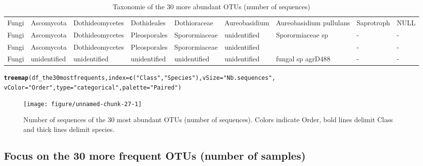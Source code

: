 \documentclass[12pt]{article}\usepackage[]{graphicx}\usepackage[]{color}
\makeatletter
\newcommand{\hlstr}[1]{\textcolor[rgb]{0.192,0.494,0.8}{#1}}%
\newcommand{\hlstd}[1]{\textcolor[rgb]{0.345,0.345,0.345}{#1}}%
\newcommand{\hlkwc}[1]{\textcolor[rgb]{0.333,0.667,0.333}{#1}}%
\newcommand{\hlkwd}[1]{\textcolor[rgb]{0.737,0.353,0.396}{\textbf{#1}}}%
\newenvironment{kframe}{%
 \def\at@end@of@kframe{}%
 \ifinner\ifhmode%
  \def\at@end@of@kframe{\end{minipage}}%
  \begin{minipage}{\columnwidth}%
 \fi\fi%
 \def\FrameCommand##1{\hskip\@totalleftmargin \hskip-\fboxsep
 \colorbox{shadecolor}{##1}\hskip-\fboxsep
     \hskip-\linewidth \hskip-\@totalleftmargin \hskip\columnwidth}%
 \MakeFramed {\advance\hsize-\width
   \@totalleftmargin\z@ \linewidth\hsize
   \@setminipage}}%
 {\par\unskip\endMakeFramed%
 \at@end@of@kframe}
\newenvironment{knitrout}{}{} %
\numberwithin{figure}{section}
\makeatother
\begin{document}
\begin{landscape}
\begin{table}[ht]
\begin{tabular}{lllllllll}
  Fungi & Ascomycota & Dothideomycetes & Dothideales & Dothioraceae & Aureobasidium & Aureobasidium pullulans & Saprotroph & NULL \\ 
  Fungi & Ascomycota & Dothideomycetes & Pleosporales & Sporormiaceae & unidentified & Sporormiaceae sp & - & - \\ 
  Fungi & Ascomycota & Dothideomycetes & Pleosporales & Sporormiaceae & unidentified &  & - & - \\ 
  Fungi & unidentified & unidentified & unidentified & unidentified & unidentified & fungal sp agrD488 & - & - \\ 
   \hline
\end{tabular}
\endgroup
\caption{Taxonomie of the 30 more
             abundant OTUs (number of sequences)} 
\end{table}

\end{landscape}

\begin{knitrout}\small
{}\color{fgcolor}\begin{kframe}
\begin{alltt}
\hlkwd{treemap}\hlstd{(df_the30mostfrequents,} \hlkwc{index} \hlstd{=} \hlkwd{c}\hlstd{(}\hlstr{"Class"}\hlstd{,} \hlstr{"Species"}\hlstd{),} \hlkwc{vSize} \hlstd{=} \hlstr{"Nb.sequences"}\hlstd{,}
        \hlkwc{vColor} \hlstd{=} \hlstr{"Order"}\hlstd{,} \hlkwc{type} \hlstd{=} \hlstr{"categorical"}\hlstd{,} \hlkwc{palette} \hlstd{=} \hlstr{"Paired"}\hlstd{)}
\end{alltt}
\end{kframe}\begin{figure}

{\centering \texttt{[image: figure/unnamed-chunk-27-1]} 

}

\caption[Number of sequences of the 30 most abundant OTUs (number of sequences)]{Number of sequences of the 30 most abundant OTUs (number of sequences). Colors indicate Order, bold lines delimit Class and thick lines delimit species.}\label{fig:unnamed-chunk-27}
\end{figure}


\end{knitrout}

  \subsection{Focus on the 30 more frequent OTUs (number of samples)}
\end{document}
